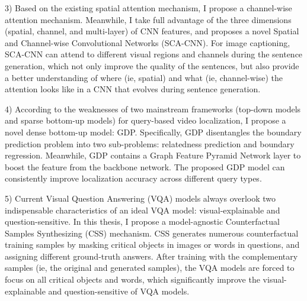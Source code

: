 \begin{englishabstract}
3) Based on the existing spatial attention mechanism, I propose a channel-wise attention mechanism. Meanwhile, I take full advantage of the three dimensions (spatial, channel, and multi-layer) of CNN features, and proposes a novel Spatial and Channel-wise Convolutional Networks (SCA-CNN). For image captioning, SCA-CNN can attend to different visual regions and channels during the sentence generation, which not only improve the quality of the sentences, but also provide a better understanding of where (ie, spatial) and what (ie, channel-wise) the attention looks like in a CNN that evolves during sentence generation.

4) According to the weaknesses of two mainstream frameworks (top-down models and sparse bottom-up models) for query-based video localization, I propose a novel dense bottom-up model: GDP. Specifically, GDP disentangles the boundary prediction problem into two sub-problems: relatedness prediction and boundary regression. Meanwhile, GDP contains a Graph Feature Pyramid Network layer to boost the feature from the backbone network. The proposed GDP model can consistently improve localization accuracy across different query types.

5) Current Visual Question Answering (VQA) models always overlook two indispensable characteristics of an ideal VQA model: visual-explainable and question-sensitive. In this thesis, I propose a model-agnostic Counterfactual Samples Synthesizing (CSS) mechanism. CSS generates numerous counterfactual training samples by masking critical objects in images or words in questions, and assigning different ground-truth answers. After training with the complementary samples (ie, the original and generated samples), the VQA models are forced to focus on all critical objects and words, which significantly improve the visual-explainable and question-sensitive of VQA models.


\end{englishabstract}
